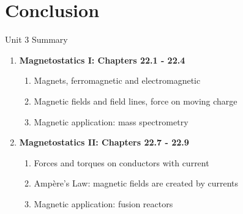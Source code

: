\documentclass{beamer}
\begin{document}
%

\section{Conclusion}

\begin{frame}{Unit 3 Summary}
\begin{enumerate}
\item \textbf{Magnetostatics I: Chapters 22.1 - 22.4}
\begin{enumerate}
\item Magnets, ferromagnetic and electromagnetic
\item Magnetic fields and field lines, force on moving charge
\item Magnetic application: \alert{mass spectrometry}
\end{enumerate}
\item \textbf{Magnetostatics II: Chapters 22.7 - 22.9}
\begin{enumerate}
\item Forces and torques on conductors with current
\item Amp\`{e}re's Law: magnetic fields are created by currents
\item Magnetic application: \alert{fusion reactors}
\end{enumerate}
\end{enumerate}
\end{frame}
\end{document}
